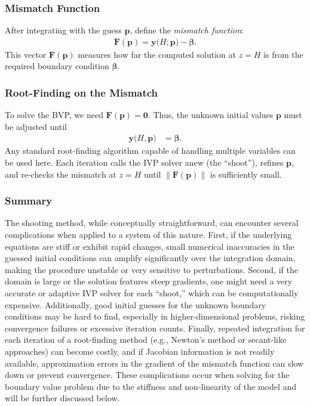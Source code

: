 \documentclass[a4paper,fleqn]{cas-sc}
\begin{document}
    \subsubsection*{Mismatch Function}
    After integrating with the guess $\mathbf{p}$, define the \emph{mismatch function}:
    \begin{align}
        \mathbf{F}(\mathbf{p}) = \mathbf{y}\bigl(H; \mathbf{p}\bigr) - \boldsymbol{\beta}.
    \end{align}
    This vector $\mathbf{F}(\mathbf{p})$ measures how far the computed solution at $z=H$ is from the required boundary condition $\boldsymbol{\beta}$.

    \subsubsection*{Root-Finding on the Mismatch}
    To solve the BVP, we need $\mathbf{F}(\mathbf{p}) = \mathbf{0}$. Thus, the unknown initial values $\mathbf{p}$ must be adjusted until
    \begin{align}
        \mathbf{y}\bigl(H,\mathbf{p}\bigr) &= \boldsymbol{\beta}.
    \end{align}
    Any standard root-finding algorithm capable of handling multiple variables can be used here. Each iteration calls the IVP solver anew (the ``shoot''), refines $\mathbf{p}$, and re-checks the mismatch at $z=H$ until $\|\mathbf{F}(\mathbf{p})\|$ is sufficiently small.

    \subsubsection*{Summary}
    The shooting method, while conceptually straightforward, can encounter several complications when applied to a system of this nature. First, if the underlying equations are stiff or exhibit rapid changes, small numerical inaccuracies in the guessed initial conditions can amplify significantly over the integration domain, making the procedure unstable or very sensitive to perturbations. Second, if the domain is large or the solution features steep gradients, one might need a very accurate or adaptive IVP solver for each “shoot,” which can be computationally expensive. Additionally, good initial guesses for the unknown boundary conditions may be hard to find, especially in higher-dimensional problems, risking convergence failures or excessive iteration counts. Finally, repeated integration for each iteration of a root-finding method (e.g., Newton’s method or secant-like approaches) can become costly, and if Jacobian information is not readily available, approximation errors in the gradient of the mismatch function can slow down or prevent convergence. These complications occur when solving for the boundary value problem due to the stiffness and non-linearity of the model and will be further discussed below.
\end{document}

